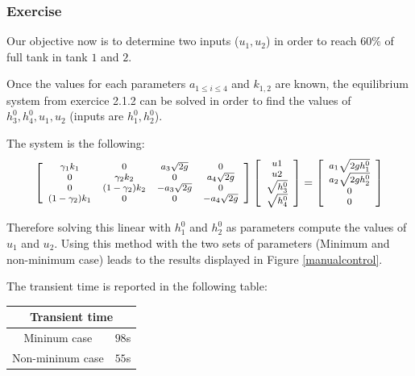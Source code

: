 \subsubsection{Exercise}

Our objective now is to determine two inputs ($u_1, u_2$) in order to reach $60\%$ of full tank in tank $1$ and $2$.

Once the values for each parameters $a_{1 \leq i \leq 4}$ and $k_{1,2}$ are known, the equilibrium system from exercice 2.1.2 can be solved in order to find the values of $h_3^0,h_4^0,u_1,u_2$ (inputs are $h_1^0,h_2^0$).  

The system is the following:
$$
    \footnotesize
\left[
    \begin{array}{cccc}
        \gamma_1 k_1 & 0 & a_3 \sqrt{2g} & 0 \\
        0 & \gamma_2 k_2 & 0 & a_4 \sqrt{2g} \\
        0 & (1-\gamma_2) k_2 & -a_3 \sqrt{2g} & 0 \\
        (1-\gamma_2) k_1 & 0 & 0 & -a_4 \sqrt{2g} \\
    \end{array}
\right]
\left[
    \begin{array}{c}
        u1 \\ u2 \\ \sqrt{h_3^0} \\ \sqrt{h_4^0}
    \end{array}
\right]
=
\left[
    \begin{array}{c}
        a_1 \sqrt{2gh_1^0} \\
        a_2 \sqrt{2gh_2^0} \\
        0 \\
        0 \\
    \end{array}
\right]
$$

Therefore solving this linear with $h_1^0$ and $h_2^0$ as parameters compute the values of $u_1$ and $u_2$. 
Using this method with the two sets of parameters (Minimum and non-minimum case) leads to the results displayed in Figure \ref{manualcontrol}.

The transient time is reported in the following table:

\begin{center}
    \footnotesize
\begin{tabular}{|cc|}
    \hline
    \multicolumn{2}{|c|}{Transient time} \\
    \hline
    Mininum case & $98$s \\
    Non-mininum case & $55$s \\
    \hline
\end{tabular}
\end{center}

